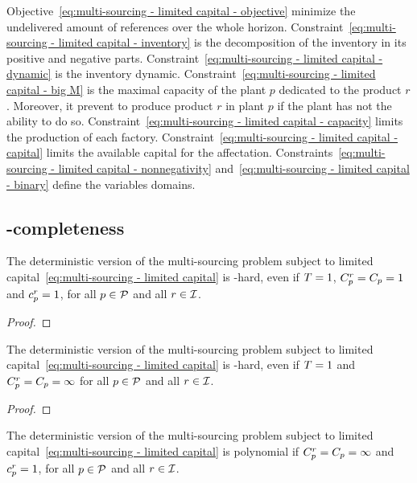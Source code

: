 Objective~\eqref{eq:multi-sourcing - limited capital - objective} minimize the undelivered amount of references over the whole horizon.
Constraint~\eqref{eq:multi-sourcing - limited capital - inventory} is the decomposition of the inventory in its positive and negative parts.
Constraint~\eqref{eq:multi-sourcing - limited capital - dynamic} is the inventory dynamic.
Constraint~\eqref{eq:multi-sourcing - limited capital - big M} is the maximal capacity of the plant $p$ dedicated to the product $r$. Moreover, it prevent to produce product $r$ in plant $p$ if the plant has not the ability to do so.
Constraint~\eqref{eq:multi-sourcing - limited capital - capacity} limits the production of each factory.
Constraint~\eqref{eq:multi-sourcing - limited capital - capital} limits the available capital for the affectation.
Constraints~\eqref{eq:multi-sourcing - limited capital - nonnegativity} and~\eqref{eq:multi-sourcing - limited capital - binary} define the variables domains.




\subsection{\NP-completeness}



\begin{prop}
The deterministic version of the multi-sourcing problem subject to limited capital~\eqref{eq:multi-sourcing - limited capital} is \NP-hard, even if $T=1$, $C_p^r=C_p=1$ and $c_p^r=1$, for all $p\in\mathcal{P}$ and all $r\in\mathcal{I}$.
\end{prop}

\begin{proof}
\tbc
\end{proof}


\begin{prop}
The deterministic version of the multi-sourcing problem subject to limited capital~\eqref{eq:multi-sourcing - limited capital} is \NP-hard, even if $T=1$ and $C_p^r=C_p=\infty$ for all $p\in\mathcal{P}$ and all $r\in\mathcal{I}$.
\end{prop}

\begin{proof}
\tbc
\end{proof}


\begin{prop}
The deterministic version of the multi-sourcing problem subject to limited capital~\eqref{eq:multi-sourcing - limited capital} is polynomial if $C_p^r=C_p=\infty$ and $c_p^r=1$, for all $p\in\mathcal{P}$ and all $r\in\mathcal{I}$.
\end{prop}

